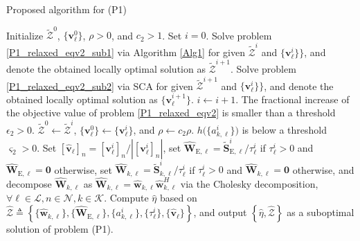 \documentclass[12pt,draftclsnofoot, onecolumn]{IEEEtran}
\theoremstyle{plain}
\begin{document}
\begin{sloppypar}
\begin{algorithm}[!t]  
	\caption{Proposed algorithm for (P1)}  \label{Alg2}  
	\begin{algorithmic}[1]
		\STATE Initialize $\tilde{\mathcal Z}^0$, $\{\mathbf v_\ell^0\}$, $\rho > 0$, and $c_2 > 1$.  %
		\REPEAT
		\STATE Set $i = 0$. 
		\REPEAT 
		\STATE Solve problem \eqref{P1_relaxed_eqv2_sub1} via Algorithm \ref{Alg1} for given $\tilde{\mathcal Z}^i$ and $\{\mathbf v_\ell^i\}\}$, and denote the obtained locally optimal solution as $\tilde{\mathcal Z}^{i+1}$. \label{step_BCD_1}
		\STATE Solve problem \eqref{P1_relaxed_eqv2_sub2} via SCA for given $\tilde{\mathcal Z}^{i+1}$ and $\{\mathbf v_\ell^i\}\}$, and denote the obtained locally optimal solution as $\{\mathbf v_\ell^{i+1}\}$. \label{step_BCD_2}
		\STATE $i \leftarrow i + 1$.
		\UNTIL The fractional increase of the objective value of problem \eqref{P1_relaxed_eqv2} is smaller than a threshold $\epsilon_2 > 0$. 
		\STATE $\tilde{\mathcal Z}^0 \leftarrow \tilde{\mathcal Z}^i$, $\{\mathbf v_\ell^0\} \leftarrow \{\mathbf v_\ell^i\}$, and $\rho\leftarrow c_2\rho$.
		\UNTIL $h\big(\{a_{k,\ell}^i\}\big)$ is below a threshold $\varsigma_2 > 0$. 
		\STATE Set $\left[ \hat{\mathbf v}_\ell\right]_n = \left[\mathbf v_\ell^i\right]_n/\left|\left[ \mathbf v_\ell^i\right]_n\right|$, set $\hat{\mathbf W}_{\mathrm E,\ell} = \tilde {\mathbf S}_{\mathrm E,\ell}^i/\tau_\ell^i$ if $\tau_\ell^i > 0$ and $\hat{\mathbf W}_{\mathrm E,\ell} = \mathbf 0$ otherwise, set $\hat{\mathbf W}_{k,\ell} = \tilde {\mathbf S}_{k,\ell}^i/\tau_\ell^i$ if $\tau_\ell^i > 0$ and $\hat{\mathbf W}_{k,\ell} = \mathbf 0$ otherwise, and decompose $\hat{\mathbf W}_{k,\ell}$ as $\hat{\mathbf W}_{k,\ell} = \hat{\mathbf w}_{k,\ell}\hat{\mathbf w}_{k,\ell}^H$ via the Cholesky
		decomposition, $\forall \ell\in\mathcal L, n\in\mathcal N, k\in\mathcal K$. \label{step_constr_1}
		\STATE Compute $\hat\eta$ based on $\hat{\mathcal Z} \triangleq \left\lbrace \{ \hat{\mathbf w}_{k,\ell}\}, \{\hat{\mathbf W}_{\mathrm E,\ell}\},\{ a_{k,\ell}^i\}, \{\tau_\ell^i\},\{\hat{\mathbf v}_\ell\}\right\rbrace$, and output $\left\lbrace\hat\eta, \hat{\mathcal Z}\right\rbrace $ as a suboptimal solution of problem (P1). \label{step_constr_2} 
	\end{algorithmic} 
\end{algorithm}


\end{sloppypar}
\end{document}
